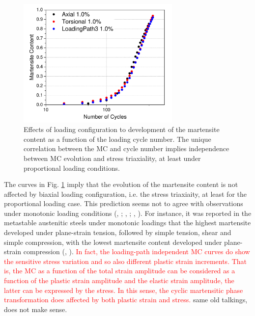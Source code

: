 \documentclass[preprint,5p,twocolumn,10pt,sort&compress]{elsarticle}
\newcommand{\marked}[1]{\textcolor{red}{#1}}
\begin{document}
\begin{figure}[!h]
  \begin{center}
  \includegraphics[width=8cm]{proportional1.pdf}
  \caption{Effects of loading configuration to development of the martensite content as a function of the loading cycle number. The unique correlation between the MC and cycle number implies independence between MC evolution and stress triaxiality, at least under proportional loading conditions.}
  \label{fig:proportional1}
  \end{center}
\end{figure}

The curves in Fig. \ref{fig:proportional1} imply that the evolution of the martensite content is not affected by biaxial loading configuration, i.e. the stress triaxiaity, at least for the proportional loading case. This prediction seems not to agree with observations under monotonic loading conditions (\citeauthor{Santacreu2006Behaviour}, \citeyear{Santacreu2006Behaviour}; \citeauthor{Beese2011Effect}, \citeyear{Beese2011Effect}; \citeauthor{Stringfellow1992A}, \citeyear{Stringfellow1992A}). For instance, it was reported in the metastable austenitic steels under monotonic loadings that the highest martensite developed under plane-strain tension, followed by simple tension, shear and simple compression, with the lowest martensite content developed under plane-strain compression (\citeauthor{Stringfellow1992A}, \citeyear{Stringfellow1992A}). \marked{In fact, the loading-path independent MC curves do show the sensitive stress variation and so also different plastic strain increments. That is, the MC as a function of the total strain amplitude can be considered as a function of the plastic strain amplitude and the elastic strain amplitude, the latter can be expressed by the stress. In this sense, the cyclic martensitic phase transformation does affected by both plastic strain and stress.}
same old talkings, does not make sense.
\end{document}
